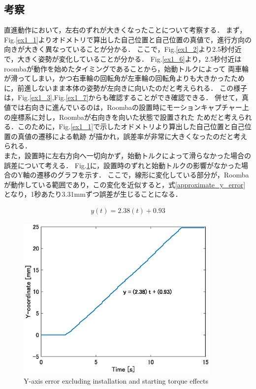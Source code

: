 \documentclass[a4paper,11pt]{jsarticle}
\begin{document}
\subsection{考察}
直進動作において，左右のずれが大きくなったことについて考察する．
まず，Fig.\ref{ex1_1}よりオドメトリで算出した自己位置と自己位置の真値で，進行方向の向きが大きく異なっていることが分かる．
ここで，Fig.\ref{ex1_2}より2.5秒付近で，大きく姿勢が変化していることが分かる．
Fig.\ref{ex1_6}より，2.5秒付近はroombaが動作を始めたタイミングであることから，始動トルクによって
両車輪が滑ってしまい，かつ右車輪の回転角が左車輪の回転角よりも大きかったために，前進しないまま本体の姿勢が左向きに向いたのだと考えられる．
この様子は，Fig.\ref{ex1_3},Fig.\ref{ex1_7}からも確認することができ確認できる．
併せて，真値では右向きに進んでいるのは，Roombaの設置時にモーションキャプチャー上の座標系に対し，Roombaが右向きを向いた状態で設置された
ためだと考えられる．このために，Fig.\ref{ex1_1}で示したオドメトリより算出した自己位置と自己位置の真値の遷移による軌跡
が描かれ，誤差率が非常に大きくなったのだと考えられる．\\
また，設置時に左右方向へ一切向かず，始動トルクによって滑らなかった場合の誤差について考える．
Fig.\ref{ex1_8}に，設置時のずれと始動トルクの影響がなかった場合のY軸の遷移のグラフを示す．
ここで，線形に変化している部分が，Roombaが動作している範囲であり，この変化を近似すると，式\ref{approximate_y_error}
となり，1秒あたり3.31mmずつ誤差が生じることになる．

\begin{align}\label{approximate_y_error}
y(t) = 2.38(t) + 0.93
\end{align}

\begin{figure}[H]\centering
\includegraphics[width=100mm]{figure/1_8.eps}
\caption{Y-axis error excluding installation and starting torque effects}
\label{ex1_8}\vspace{0zh}\end{figure}
\end{document}
